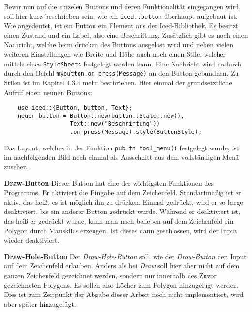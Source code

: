 Bevor nun auf die einzelen Buttons und deren Funktionalität eingegangen wird, soll hier kurz beschrieben sein, wie ein \lstinline{iced::button} überhaupt aufgebaut ist. 
Wie angedeutet, ist ein Button ein Element aus der Iced-Bibliothek. Es besitzt einen Zustand und ein Label, also eine Beschriftung. Zusätzlich gibt es noch einen Nachricht, welche beim drücken des Buttons ausgelöst wird und neben vielen weiteren Einstellungen wie Breite und Höhe auch noch einen 
Stile, welcher mittels eines \lstinline{StyleSheets} festgelegt werden kann. Eine Nachricht wird dadurch durch den Befehl  \lstinline{mybutton.on_press(Message)} an den Button gebundnen. 
Zu Stilen ist im Kapitel 4.3.4 mehr beschrieben. Hier einmal der grundsetztliche Aufruf einen neunen Buttons:


\begin{lstlisting}
    use iced::{Button, button, Text};
    neuer_button = Button::new(button::State::new(), 
                   Text::new("Beschriftung"))
                   .on_press(Message).style(ButtonStyle);
\end{lstlisting}

Das Layout, welches in der Funktion \lstinline{pub fn tool_menu()} festgelegt wurde, ist im nachfolgenden Bild noch einmal als Ausschnitt aus dem vollständigen Menü zusehen.
\linebreak

\textbf{\small{Draw-Button}}\linebreak
Dieser Button hat eine der wichtigsten Funktionen des Programms. Er aktiviert die Eingabe auf dem Zeichenfeld. Standartmäßig ist er aktiv, das heißt es ist möglich ihn zu drücken. Einmal gedrückt, wird er so lange 
deaktiviert, bis ein anderer Button gedrückt wurde. Während er deaktiviert ist, das heiß er gedrückt wurde, kann man nach belieben auf dem Zeichenfeld ein Polygon durch Mausklics erzeugen. Ist dieses dann geschlossen, wird der 
Input wieder deaktiviert.\linebreak

\textbf{\small{Draw-Hole-Button}}\linebreak
Der \emph{Draw-Hole-Button} soll, wie der \emph{Draw-Button} den Input auf dem Zeichenfeld erlauben. Anders als bei \emph{Draw} soll hier aber nicht auf dem ganzen Zeichenfeld
gezeichnet werden, sondern nur innerhalb des Zuvor gezeichneten Polygons. Es sollen also Löcher zum Polygon hinzugefügt werden. Dies ist zum Zeitpunkt der Abgabe dieser Arbeit noch nicht implementiert, wird aber später hinzugefügt.
\linebreak

